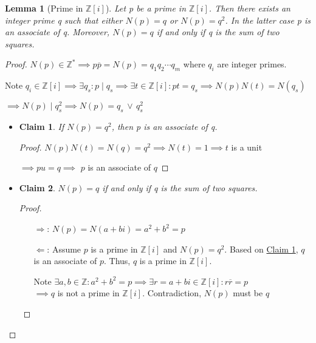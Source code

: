 \documentclass{article}
\newtheorem*{lem}{Lemma}
\newtheorem{claim}{Claim}
\theoremstyle{definition}\newtheorem{definition}{Definition}
\begin{document}
	\begin{lem}[Prime in ${\mathbb Z [i] }$]
		Let p be a prime in ${\mathbb Z [i] }$. Then there exists an integer prime q such that either $N (p) = q$ or $N (p) = q^2$. In the latter case p is an associate of q. Moreover, $N (p) = q$ if and only if q is the sum of two squares.
	\end{lem}
	\begin{proof}
		$N(p) \in \mathbb{Z}^* \implies p \overline {p} = N(p)=q_1q_2\cdots q_m$ where $q_i$ are integer primes. 
		
		Note $q_i \in {\mathbb Z [i] } \implies \exists q_s : p \mid q_s \implies \exists t \in {\mathbb Z [i] } : pt=q_s \implies N(p) N(t)= N(q_s) $
		
		$\implies N(p) \mid q_s^2 \implies N(p)= q_s \, \lor \, q_s^2$
		

		\begin{itemize}\renewcommand{\labelitemi}{}
			\item 
				\begin{claim} \label{associate}
					If $N (p) = q^2$, then p is an associate of q.
				\end{claim}
				\begin{proof}\renewcommand{\qedsymbol}{$\blacksquare$}
					$N(p) N(t)= N(q)=q^2 \implies N(t)=1 \implies t$  is a unit
					
					$\implies pu=q \implies$ $p$ is an associate of $q$
				\end{proof}	
			\item 
				\begin{claim}
				$N (p) = q$ if and only if q is the sum of two squares.	
				\end{claim}
				\begin{proof}\renewcommand{\qedsymbol}{$\blacksquare$}\
					\begin{itemize}
						\item[$\Rightarrow$:]
							$N (p) = N(a+bi)=a^2+b^2=p$
						\item [$\Leftarrow$:]
							Assume $p$ is a prime in ${\mathbb Z [i] }$ and $N (p) = q^2$. Based on \hyperref[associate]{Claim 1}, $q$ is an associate of $p$. Thus, $q$ is a prime in ${\mathbb Z [i] }$.
							
							Note $\exists a,b \in \mathbb Z : a^2+b^2=p \implies \exists r=a+bi \in {\mathbb Z [i] } : r\overline {r}=p$\\
							$\implies q$ is not a prime in ${\mathbb Z [i] }$. Contradiction, $N(p)$ must be $q$
					\end{itemize}
				\end{proof}							
		\end{itemize}

	\end{proof}

		
\end{document}
